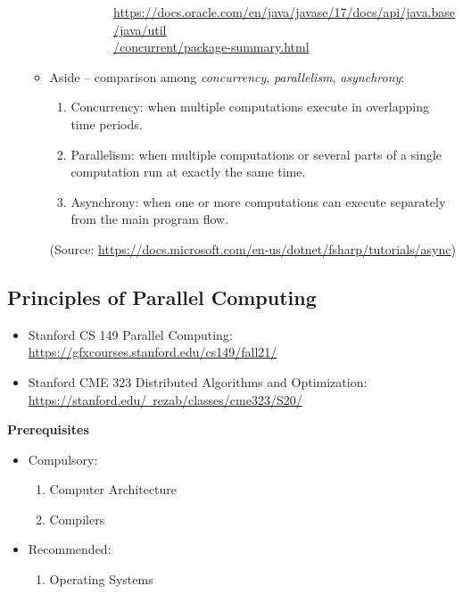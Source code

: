 \documentclass{article}
\begin{document}
\begin{itemize}
\begin{itemize}
\begin{itemize}
\begin{enumerate}
\begin{itemize}
                    \href{https://docs.oracle.com/en/java/javase/17/docs/api/java.base/java/util/concurrent/package-summary.html}{https://docs.oracle.com/en/java/javase/17/docs/api/java.base/java/util\\/concurrent/package-summary.html}
                    \end{itemize}
            \end{enumerate}
        \end{itemize}
        \item Aside -- comparison among \emph{concurrency}, \emph{parallelism}, \emph{asynchrony}:
        \begin{enumerate}
            \item Concurrency: when multiple computations execute in overlapping time periods.
            \item Parallelism: when multiple computations or several parts of a single computation run at exactly the same time.
            \item Asynchrony: when one or more computations can execute separately from the main program flow.
        \end{enumerate}
        (Source: \href{https://docs.microsoft.com/en-us/dotnet/fsharp/tutorials/async}{https://docs.microsoft.com/en-us/dotnet/fsharp/tutorials/async})
    \end{itemize}
\end{itemize}
\subsection{Principles of Parallel Computing}
\begin{itemize}
    \item Stanford CS 149 Parallel Computing:
    \href{https://gfxcourses.stanford.edu/cs149/fall21/}{https://gfxcourses.stanford.edu/cs149/fall21/}
    \item Stanford CME 323 Distributed Algorithms and Optimization:\\
    \href{https://stanford.edu/~rezab/classes/cme323/S20/}{https://stanford.edu/~rezab/classes/cme323/S20/}
\end{itemize}
\textbf{Prerequisites}
    \begin{itemize}
        \item Compulsory:
        \begin{enumerate}
        \item Computer Architecture
        \item Compilers
    \end{enumerate}
        \item Recommended:
        \begin{enumerate}
            \item Operating Systems
        \end{enumerate}
    \end{itemize}
\end{document}
